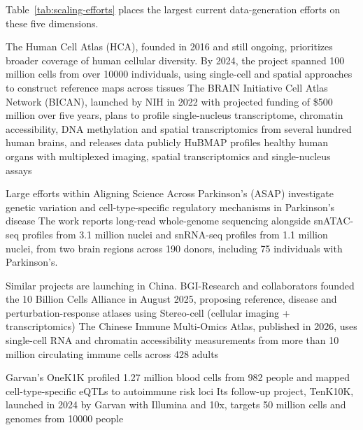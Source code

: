 Table~\ref{tab:scaling-efforts} places the largest current data-generation efforts on these five dimensions.

The Human Cell Atlas (HCA), founded in 2016 and still ongoing, prioritizes broader coverage of human cellular diversity. By 2024, the project spanned 100 million cells from over \num{10000} individuals, using single-cell and spatial approaches to construct reference maps across tissues The BRAIN Initiative Cell Atlas Network (BICAN), launched by NIH in 2022 with projected funding of \$500 million over five years, plans to profile single-nucleus transcriptome, chromatin accessibility, DNA methylation and spatial transcriptomics from several hundred human brains, and releases data publicly HuBMAP profiles healthy human organs with multiplexed imaging, spatial transcriptomics and single-nucleus assays

Large efforts within Aligning Science Across Parkinson's (ASAP) investigate genetic variation and cell-type-specific regulatory mechanisms in Parkinson's disease The work reports long-read whole-genome sequencing alongside snATAC-seq profiles from 3.1 million nuclei and snRNA-seq profiles from 1.1 million nuclei, from two brain regions across 190 donors, including 75 individuals with Parkinson's.

Similar projects are launching in China. BGI-Research and collaborators founded the 10 Billion Cells Alliance in August 2025, proposing reference, disease and perturbation-response atlases using Stereo-cell (cellular imaging + transcriptomics) The Chinese Immune Multi-Omics Atlas, published in 2026, uses single-cell RNA and chromatin accessibility measurements from more than 10 million circulating immune cells across 428 adults

Garvan's OneK1K profiled 1.27 million blood cells from 982 people and mapped cell-type-specific eQTLs to autoimmune risk loci Its follow-up project, TenK10K, launched in 2024 by Garvan with Illumina and 10x, targets 50 million cells and genomes from \num{10000} people

